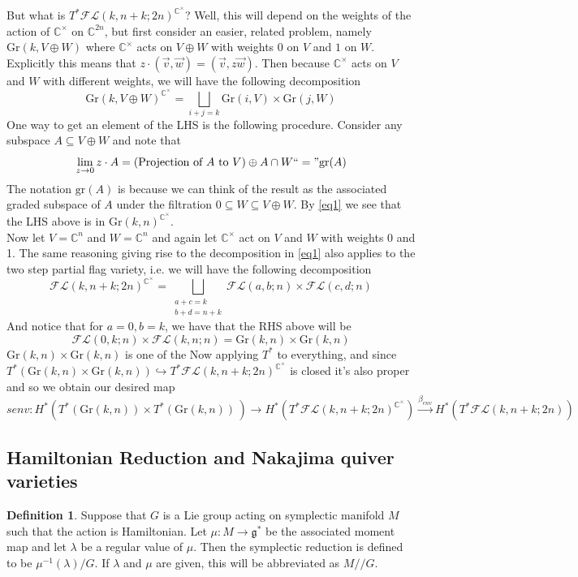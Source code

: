 \documentclass[12pt]{amsart}
\numberwithin{equation}{section}
\theoremstyle{definition}
\newtheorem{Definition}[equation]{Definition}
\numberwithin{figure}{section}
\newcommand{\C}{\mathbb{C}}
\newcommand{\grass}[2]{\mathrm{Gr}(#1,#2)}
\newcommand{\fl}{\mathcal{FL}}
\begin{document}
But what is $T^*\fl(k, n+k; 2n)^{\C^\times}$? Well, this will depend on the weights of the action of $\C^\times$ on $\C^{2n}$, but first consider an easier, related problem, namely $\grass{k}{V\oplus W}$ where $\C^\times$ acts on $V\oplus W$ with weights $0$ on $V$ and $1$ on $W$. Explicitly this means that $z\cdot(\vec{v}, \vec{w})=(\vec{v}, z\vec{w})$. Then because $\C^\times$ acts on $V$ and $W$ with different weights, we will have the following decomposition
\begin{equation}
\label{eq1}
\grass{k}{V\oplus W}^{\C^\times}=\bigsqcup_{i+j=k} \grass{i}{V}\times \grass{j}{W} 
\end{equation}  
One way to get an element of the LHS is the following procedure. Consider any subspace $A\subseteq V\oplus W$ and note that
\[ \lim_{z\to 0} z\cdot A=(\textnormal{Projection of }A \textnormal{ to }V)\oplus A\cap W``=" \mathrm{gr}(A) \]
The notation $\mathrm{gr}(A) $ is because we can think of the result as the associated graded subspace of $A$ under the filtration $0\subseteq W\subseteq V\oplus W$. By \cref{eq1} we see that the LHS above is in $\grass{k}{n}^{\C^\times}$. \\

Now let $V=\C^n$ and $W= \C^n$ and again let $\C^\times$ act on $V$ and $W$ with weights 0 and 1. The same reasoning giving rise to the decomposition in \cref{eq1} also applies to the two step partial flag variety, i.e. we will have the following decomposition
\[ \fl(k, n+k; 2n)^{\C^\times}= \bigsqcup_{\substack{a+c=k \\ b+d=n+k}} \fl(a,b ; n)\times \fl(c,d; n) \]
And notice that for $a=0, b=k$, we have that the RHS above will be
\[ \fl(0,k ; n)\times \fl(k, n ; n)=\grass{k}{n}\times \grass{k}{n} \]
$\grass{k}{n}\times \grass{k}{n}$ is one of the 
Now applying $T^*$ to everything, and since $T^*(\grass{k}{n}\times \grass{k}{n})\hookrightarrow T^* \fl(k, n+k; 2n)^{\C^\times}$ is closed it's also proper and so we obtain our desired map
\[ senv: H^*(T^*( \grass{k}{n})\times T^*(\grass{k}{n}) \, )\to H^*(T^*\fl(k, n+k; 2n)^{\C^\times})\xrightarrow{\beta_{env}} H^*(T^*\fl(k, n+k; 2n)) \] 

\subsection{Hamiltonian Reduction and Nakajima quiver varieties}

\begin{Definition}
Suppose that $G$ is a Lie group acting on symplectic manifold $M$ such that the action is Hamiltonian. Let $\mu: M\to \mathfrak{g}^*$ be the associated moment map and let $\lambda$ be a regular value of $\mu$. Then the symplectic reduction is defined to be $\mu^{-1}(\lambda)/G$. If $\lambda$ and $\mu$ are given, this will be abbreviated as $M//G$.
\end{Definition}
\end{document}
